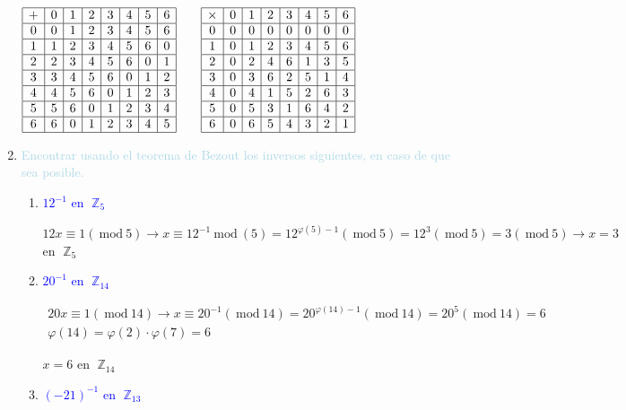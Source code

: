 \documentclass{article}
\newcommand{\lb}[1]{\textcolor{lightblue}{#1}}
\newcommand{\db}[1]{\textcolor{blue}{#1}}
\DeclareMathOperator{\Z}{\mathbb{Z}}
\renewcommand{\mod}{~\mathrm{mod}~}
\begin{document}
\begin{enumerate}[label=\color{red}\textbf{\arabic*)}, leftmargin=*]
	$\begin{array}{|c|c|c|c|c|c|c|c|}
		\hline
		+ & 0 & 1 & 2 & 3 & 4 & 5 & 6 \\ \hline
		0 & 0 & 1 & 2 & 3 & 4 & 5 & 6 \\ \hline
		1 & 1 & 2 & 3 & 4 & 5 & 6 & 0 \\ \hline
		2 & 2 & 3 & 4 & 5 & 6 & 0 & 1 \\ \hline
		3 & 3 & 4 & 5 & 6 & 0 & 1 & 2 \\ \hline
		4 & 4 & 5 & 6 & 0 & 1 & 2 & 3 \\ \hline
		5 & 5 & 6 & 0 & 1 & 2 & 3 & 4 \\ \hline
		6 & 6 & 0 & 1 & 2 & 3 & 4 & 5 \\ \hline
	\end{array}\qquad\begin{array}{|c|c|c|c|c|c|c|c|}
	\hline
	\times & 0 & 1 & 2 & 3 & 4 & 5 & 6 \\ \hline
	0 & 0 & 0 & 0 & 0 & 0 & 0 & 0 \\ \hline
	1 & 0 & 1 & 2 & 3 & 4 & 5 & 6 \\ \hline
	2 & 0 & 2 & 4 & 6 & 1 & 3 & 5 \\ \hline
	3 & 0 & 3 & 6 & 2 & 5 & 1 & 4 \\ \hline
	4 & 0 & 4 & 1 & 5 & 2 & 6 & 3 \\ \hline
	5 & 0 & 5 & 3 & 1 & 6 & 4 & 2 \\ \hline
	6 & 0 & 6 & 5 & 4 & 3 & 2 & 1\\ \hline
	\end{array}$
	\item \lb{Encontrar usando el teorema de Bezout los inversos siguientes, en caso de que sea posible.}
	\begin{enumerate}[label=\color{red}\alph*)]
		\item \db{$12^{-1}$ en $\Z_5$}
		
		$12x\equiv1(\mod5)\longrightarrow x\equiv12^{-1}\mod(5)=12^{\varphi(5)-1}(\mod 5)=12^{3}(\mod5)=3(\mod5)\longrightarrow x=3$ en $\Z_5$
		\item \db{$20^{-1}$ en $\Z_{14}$}
		
		$\begin{array}{l}
			20x\equiv1(\mod14)\longrightarrow x\equiv20^{-1}(\mod14)=20^{\varphi(14)-1}(\mod14)=20^5(\mod14)=6\\
			\varphi(14)=\varphi(2)\cdot\varphi(7)=6
		\end{array}$
		
		$x=6$ en $\Z_{14}$
		\item \db{$(-21)^{-1}$ en $\Z_{13}$}
		

\end{enumerate}
\end{enumerate}
\end{document}
